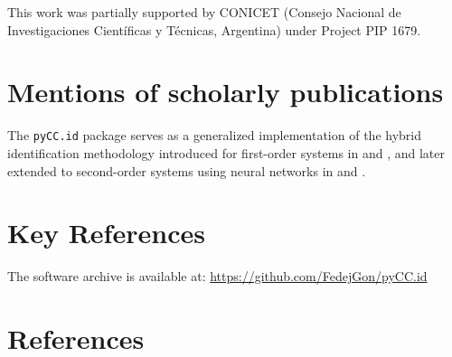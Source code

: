 This work was partially supported by CONICET (Consejo Nacional de
Investigaciones Científicas y Técnicas, Argentina) under Project PIP
1679.

\hypertarget{mentions-of-scholarly-publications}{%
\section{Mentions of scholarly
publications}\label{mentions-of-scholarly-publications}}

The \texttt{pyCC.id} package serves as a generalized implementation of
the hybrid identification methodology introduced for first-order systems
in \autocite{Gonzalez2023} and \autocite{Gonzalez2024}, and later
extended to second-order systems using neural networks in
\autocite{Gonzalez2025nody} and \autocite{Gonzalez2025arxiv}.

\hypertarget{key-references}{%
\section{Key References}\label{key-references}}

The software archive is available at:
\url{https://github.com/FedejGon/pyCC.id}

\hypertarget{references}{%
\section{References}\label{references}}

